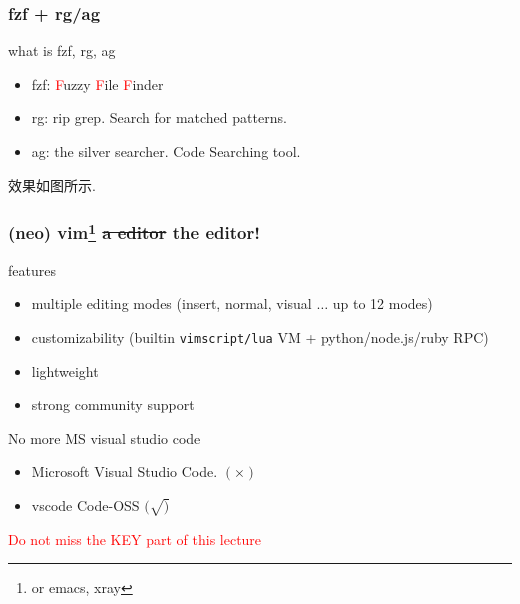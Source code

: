 \documentclass[8pt,t]{beamer}
\begin{document}
\begin{frame}
	\frametitle{fzf + rg/ag}
	\begin{block}{what is fzf, rg, ag}
		\begin{itemize}
			\item fzf: \textcolor{red}{F}uzzy \textcolor{red}{F}ile \textcolor{red}{F}inder
			\item rg: rip grep. Search for matched patterns.
			\item ag: the silver searcher. Code Searching tool.
		\end{itemize}
	\end{block}


	\vfill

	\begin{examples}
		效果如图所示.
	\end{examples}
\end{frame}


\begin{frame}
	\frametitle{(neo) vim\footnote{or emacs, xray} \sout{a editor} the editor!}

	\begin{block}{features}
		\begin{itemize}
			\item multiple editing modes (insert, normal, visual $\ldots$ up to 12 modes)
			\item customizability (builtin \texttt{vimscript/lua} VM + python/node.js/ruby RPC)
			\item lightweight
			\item strong community support
		\end{itemize}
	\end{block}

	\vfill
	\begin{alertblock}{No more MS visual studio code}
		\begin{itemize}
			\item Microsoft Visual Studio Code.  $(\times)$
			\item vscode Code-OSS $(\surd)$
		\end{itemize}
	\end{alertblock}
\end{frame}


\begin{frame}[c]
	\centering \huge {\textcolor{red}{Do not miss the KEY part of this lecture}}
\end{frame}
\end{document}
